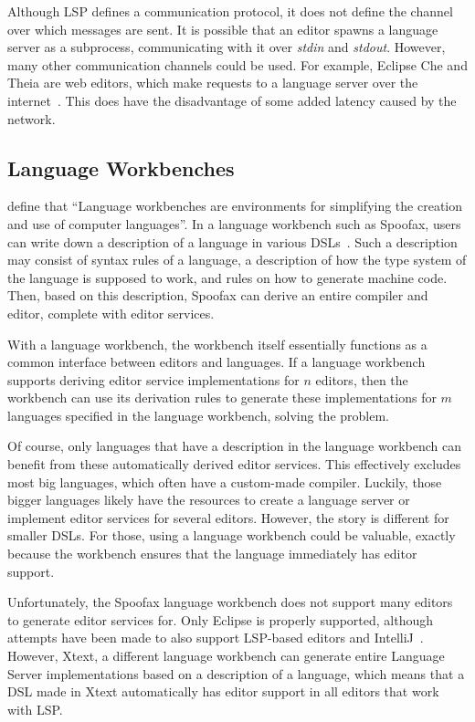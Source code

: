 Although \ac{LSP} defines a communication protocol, it does not define the channel over which messages are sent.
It is possible that an editor spawns a language server as a subprocess, communicating with it over \textit{stdin} and \textit{stdout}.
However, many other communication channels could be used.
For example, Eclipse Che and Theia are web editors, which make requests to a language server over the internet~\autocite{che, theia}.
This does have the disadvantage of some added latency caused by the network.

\subsection{Language Workbenches}\label{subsec:language-workbenches}

\textcite{ErdwegSVTBCGH0L15} define that ``Language workbenches are environments for simplifying the creation and use of computer languages''.
In a language workbench such as Spoofax, users can write down a description of a language in various \acp{DSL}~\autocite{Fowler2004, KallebergV07, KatsV10a}.
Such a description may consist of syntax rules of a language, a description of how the type system of the language is supposed to work, and rules on how to generate machine code.
Then, based on this description, Spoofax can derive an entire compiler and editor, complete with editor services.

With a language workbench, the workbench itself essentially functions as a common interface between editors and languages.
If a language workbench supports deriving editor service implementations for $n$ editors, then the workbench can use its
derivation rules to generate these implementations for $m$ languages specified in the language workbench, solving the \problem{\times} problem.

Of course, only languages that have a description in the language workbench can benefit from these automatically derived editor services.
This effectively excludes most big languages, which often have a custom-made compiler.
Luckily, those bigger languages likely have the resources to create a language server or implement editor services for several editors.
However, the story is different for smaller \acp{DSL}.
For those, using a language workbench could be valuable, exactly because the workbench ensures that the language immediately has editor support.

Unfortunately, the Spoofax language workbench does not support many editors to generate editor services for.
Only Eclipse is properly supported, although attempts have been made to also support \ac{LSP}-based editors and IntelliJ~\autocite{Pelsmaeker2018}.
However, Xtext, a different language workbench can generate entire Language Server implementations based on a description of a language,
which means that a \ac{DSL} made in Xtext automatically has editor support in all editors that work with \ac{LSP}.

